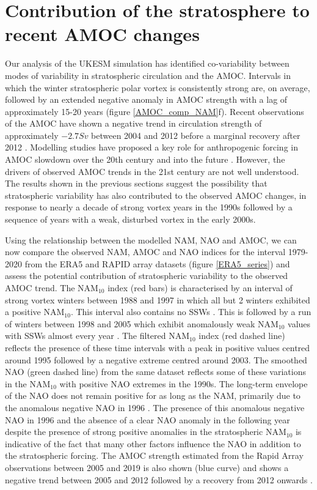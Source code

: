 \section{Contribution of the stratosphere to recent AMOC changes}
\label{sec:AMOC_obs_contribution}
Our analysis of the UKESM simulation has identified co-variability between modes of variability in stratospheric circulation and the AMOC. Intervals in which the winter stratospheric polar vortex is consistently strong are, on average, followed by an extended negative anomaly in AMOC strength with a lag of approximately 15-20 years (figure \ref{AMOC_comp_NAM}f). Recent observations of the AMOC have shown a negative trend in circulation strength of approximately $-2.7 Sv$ between 2004 and 2012 \citep{smeedNorth2018b} before a marginal recovery after 2012 \citep{smeedAtlantic2019c}. Modelling studies have proposed a key role for anthropogenic forcing in AMOC slowdown over the 20th century and into the future \citep{liuOverlooked2017a, bakkerFate2016b, liuMechanisms2019b}. However, the drivers of observed AMOC trends in the 21st century are not well understood. The results shown in the previous sections suggest the possibility that stratospheric variability has also contributed to the observed AMOC changes, in response to nearly a decade of strong vortex years in the 1990s followed by a sequence of years with a weak, disturbed vortex in the early 2000s. 

Using the relationship between the modelled NAM, NAO and AMOC, we can now compare the observed NAM, AMOC and NAO indices for the interval 1979-2020 from the ERA5 and RAPID array datasets (figure \ref{ERA5_series}) and assess the potential contribution of stratospheric variability to the observed AMOC trend. The NAM$_{10}$ index (red bars) is characterised by an interval of strong vortex winters between 1988 and 1997 in which all but 2 winters exhibited a positive NAM$_{10}$. This interval also contains no SSWs \citep{pawsonCold1999b}. This is followed by a run of winters between 1998 and 2005 which exhibit anomalously weak NAM$_{10}$ values with SSWs almost every year \citep{manneyRemarkable2005a}. The filtered NAM$_{10}$ index (red dashed line) reflects the presence of these time intervals with a peak in positive values centred around 1995 followed by a negative extreme centred around 2003. The smoothed NAO (green dashed line) from the same dataset reflects some of these variations in the NAM$_{10}$ with positive NAO extremes in the 1990s. The long-term envelope of the NAO does not remain positive for as long as the NAM, primarily due to the anomalous negative NAO in 1996 \citep{halpertClimate1997b}. The presence of this anomalous negative NAO in 1996 and the absence of a clear NAO anomaly in the following year despite the presence of strong positive anomalies in the stratospheric NAM$_{10}$ is indicative of the fact that many other factors influence the NAO in addition to the stratospheric forcing. The AMOC strength estimated from the Rapid Array observations between 2005 and 2019 is also shown (blue curve) and shows a negative trend between 2005 and 2012 followed by a recovery from 2012 onwards \citep{smeedNorth2018b, smeedAtlantic2019c}. 

